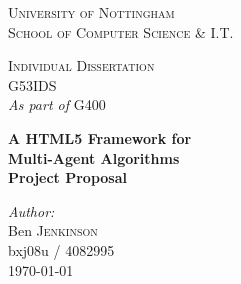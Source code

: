 \begin{titlepage}

	\begin{center}
	
		
		\vspace*{4cm}

		\textsc{\LARGE University of Nottingham}\\[0.3cm]
		\textsc{\Large School of Computer Science \& I.T.}\\
		
		\vspace{1cm}
	
		\textsc{\Large Individual Dissertation}\\[0.3cm]
		\textsc{\large G53IDS}\\[0.2cm]
		\large \emph{As part of} \textsc{G400}\\
		
		\vspace{1cm}
	
		{\huge \textbf{A HTML5 Framework for}}\\[0.3cm]
		{\huge \textbf{Multi-Agent Algorithms}}\\[0.6cm]
		{\huge \textbf{Project Proposal}}\\
		
		\vspace{1cm}
		
		\emph{Author:}\\
		Ben \textsc{Jenkinson}\\[0.5cm]
		\small{bxj08u / 4082995}\\[0.5cm]
	
		{\large \today}\\


	\end{center}

\end{titlepage}